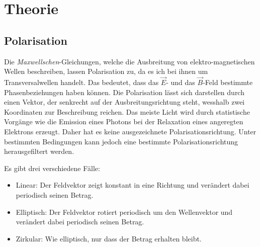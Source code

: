 \documentclass[12pt,a4paper,titlepage,headinclude,bibtotoc]{scrartcl}
\begin{document}
\section{Theorie}
\label{sec:theorie}
\subsection{Polarisation}
Die \textit{Maxwellschen}-Gleichungen, welche die Ausbreitung von elektro-magnetischen Wellen beschreiben, lassen Polarisation zu, da es ich bei ihnen um Transversalwellen handelt.
Das bedeutet, dass das $\vec E$- und das $\vec B$-Feld bestimmte Phasenbeziehungen haben können.
Die Polarisation lässt sich darstellen durch einen Vektor, der senkrecht auf der Ausbreitungsrichtung steht, wesshalb zwei Koordinaten zur Beschreibung reichen.
Das meiste Licht wird durch statistische Vorgänge wie die Emission eines Photons bei der Relaxation eines angeregten Elektrons erzeugt.
Daher hat es keine ausgezeichnete Polarisationsrichtung.
Unter bestimmten Bedingungen kann jedoch eine bestimmte Polarisationsrichtung herausgefiltert werden.

Es gibt drei verschiedene Fälle:
\begin{itemize}
	\item Linear: Der Feldvektor zeigt konstant in eine Richtung und verändert dabei periodisch seinen Betrag.
	\item Elliptisch: Der Feldvektor rotiert periodisch um den Wellenvektor und verändert dabei periodisch seinen Betrag.
	\item Zirkular: Wie elliptisch, nur dass der Betrag erhalten bleibt.
\end{itemize}



\cite{lp20}
\end{document}
